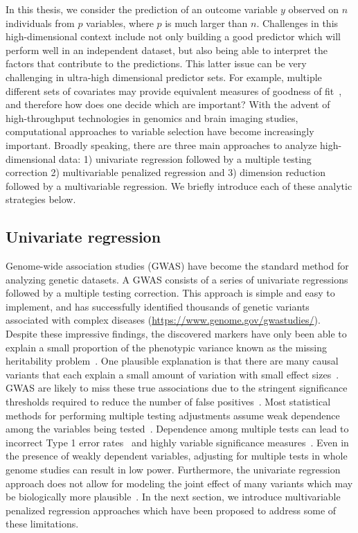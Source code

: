 In this thesis, we consider the prediction of an outcome variable $y$ observed on $n$ individuals from $p$ variables, where $p$ is much larger than $n$. 
Challenges in this high-dimensional context include not only building a good predictor which will perform well in an independent dataset, but also being able to interpret the factors that contribute to the predictions. 
This latter issue can be very challenging in ultra-high dimensional predictor sets. 
For example, multiple different sets of covariates may provide equivalent measures of goodness of fit~\citep{fan2014challenges}, and therefore how does one decide which are important? 
With the advent of high-throughput technologies in genomics and brain imaging studies, computational approaches to variable selection have become increasingly important. 
Broadly speaking, there are three main approaches to analyze high-dimensional data: 1) univariate regression followed by a multiple testing correction 2) multivariable penalized regression and 3) dimension reduction followed by a multivariable regression. We briefly introduce each of these analytic strategies below.


\subsection{Univariate regression} \label{sec:single}

Genome-wide association studies (GWAS) have become the standard method for analyzing genetic datasets. A GWAS consists of a series of univariate regressions followed by a multiple testing correction. 
This approach is simple and easy to implement, and has successfully identified thousands of genetic variants associated with complex diseases (\url{https://www.genome.gov/gwastudies/}). 
Despite these impressive findings, the discovered markers have only been able to explain a small proportion of the phenotypic variance known as the missing heritability problem~\citep{manolio2009finding}.
One plausible explanation is that there are many causal variants that each explain a small amount of variation with small effect sizes~\citep{yang2010common}.
GWAS are likely to miss these true associations due to the stringent significance thresholds required to reduce the number of false positives~\citep{manolio2009finding}.
Most statistical methods for performing multiple testing adjustments assume weak dependence among the variables being tested~\citep{leek2008general}. 
Dependence among multiple tests can lead to incorrect Type 1 error rates~\citep{lin2013test} and highly variable significance measures~\citep{leek2008general}. 
Even in the presence of weakly dependent variables, adjusting for multiple tests in whole genome studies can result in low power. 
Furthermore, the univariate regression approach does not allow for modeling the joint effect of many variants which may be biologically more plausible~\citep{schadt2009molecular}. 
In the next section, we introduce multivariable penalized regression approaches which have been proposed to address some of these limitations. 



